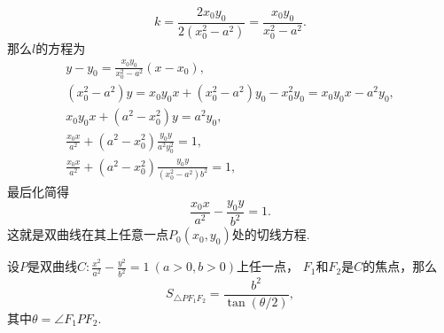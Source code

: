 \begin{example}
\begin{solution}
\begin{equation*}
	k = \frac{2 x_0 y_0}{2 (x_0^2 - a^2)}
	= \frac{x_0 y_0}{x_0^2 - a^2}.
\end{equation*}
那么\(l\)的方程为\begin{gather*}
	y - y_0 = \frac{x_0 y_0}{x_0^2 - a^2} (x - x_0), \\
	(x_0^2 - a^2) y = x_0 y_0 x + (x_0^2 - a^2) y_0 - x_0^2 y_0
	= x_0 y_0 x - a^2 y_0, \\
	x_0 y_0 x + (a^2 - x_0^2) y = a^2 y_0, \\
	\frac{x_0 x}{a^2} + (a^2 - x_0^2) \frac{y_0 y}{a^2 y_0^2} = 1, \\
	\frac{x_0 x}{a^2} + (a^2 - x_0^2) \frac{y_0 y}{(x_0^2 - a^2) b^2} = 1,
\end{gather*}
最后化简得\begin{equation}\label{equation:平面解析几何.双曲线的切线}
	\frac{x_0 x}{a^2} - \frac{y_0 y}{b^2} = 1.
\end{equation}
这就是双曲线在其上任意一点\(P_0(x_0,y_0)\)处的切线方程.
\end{solution}
\end{example}

\begin{theorem}[双曲线的焦点三角形]
设\(P\)是双曲线\(C: \frac{x^2}{a^2} - \frac{y^2}{b^2} = 1\ (a>0,b>0)\)上任一点，
\(F_1\)和\(F_2\)是\(C\)的焦点，那么\begin{equation*}
	S_{\triangle P F_1 F_2} = \frac{b^2}{\tan(\theta/2)},
\end{equation*}
其中\(\theta=\angle{F_1 P F_2}\).
\end{theorem}
